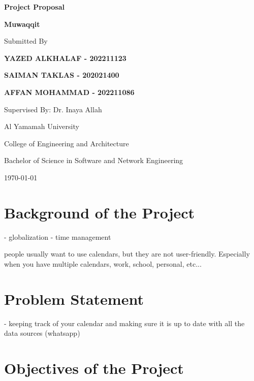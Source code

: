 \documentclass[12pt,a4paper]{article}
\begin{document}
\begin{titlepage}
\begin{center}
\vspace*{2cm}
{\huge\bfseries Project Proposal\par}
\vspace{1.5cm}
{\Large\bfseries Muwaqqit\par}
\vspace{2cm}
{\Large Submitted By\par}
\vspace{1cm}
{\Large\bfseries YAZED ALKHALAF - 202211123\par}
{\Large\bfseries SAIMAN TAKLAS - 202021400\par}
{\Large\bfseries AFFAN MOHAMMAD - 202211086\par}
\vfill
{\Large Supervised By: Dr. Inaya Allah\par}
\vspace{1cm}
{\Large Al Yamamah University\par}
{\Large College of Engineering and Architecture\par}
{\Large Bachelor of Science in Software and Network Engineering\par}
\vspace{1cm}
{\Large \today\par}
\end{center}
\end{titlepage}

\tableofcontents
\clearpage

\doublespacing

\section{Background of the Project}

- globalization
- time management

people usually want to use calendars, but they are not user-friendly. Especially when you have multiple calendars, work, school, personal, etc...

\section{Problem Statement}

- keeping track of your calendar and making sure it is up to date with all the data sources (whatsapp)

\section{Objectives of the Project}
\end{document}
